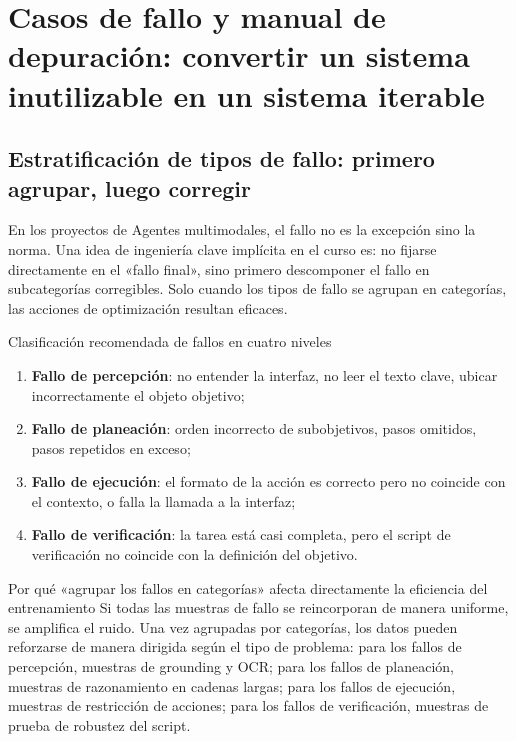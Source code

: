 \section{Casos de fallo y manual de depuración: convertir un sistema inutilizable en un sistema iterable}

\subsection{Estratificación de tipos de fallo: primero agrupar, luego corregir}
En los proyectos de Agentes multimodales, el fallo no es la excepción sino la norma. Una idea de ingeniería clave implícita en el curso es: no fijarse directamente en el «fallo final», sino primero descomponer el fallo en subcategorías corregibles. Solo cuando los tipos de fallo se agrupan en categorías, las acciones de optimización resultan eficaces.

\begin{importantbox}{Clasificación recomendada de fallos en cuatro niveles}
\begin{enumerate}
    \item \textbf{Fallo de percepción}: no entender la interfaz, no leer el texto clave, ubicar incorrectamente el objeto objetivo;
    \item \textbf{Fallo de planeación}: orden incorrecto de subobjetivos, pasos omitidos, pasos repetidos en exceso;
    \item \textbf{Fallo de ejecución}: el formato de la acción es correcto pero no coincide con el contexto, o falla la llamada a la interfaz;
    \item \textbf{Fallo de verificación}: la tarea está casi completa, pero el script de verificación no coincide con la definición del objetivo.
\end{enumerate}
\end{importantbox}

\begin{knowledgebox}{Por qué «agrupar los fallos en categorías» afecta directamente la eficiencia del entrenamiento}
Si todas las muestras de fallo se reincorporan de manera uniforme, se amplifica el ruido. Una vez agrupadas por categorías, los datos pueden reforzarse de manera dirigida según el tipo de problema: para los fallos de percepción, muestras de grounding y OCR; para los fallos de planeación, muestras de razonamiento en cadenas largas; para los fallos de ejecución, muestras de restricción de acciones; para los fallos de verificación, muestras de prueba de robustez del script.
\end{knowledgebox}

